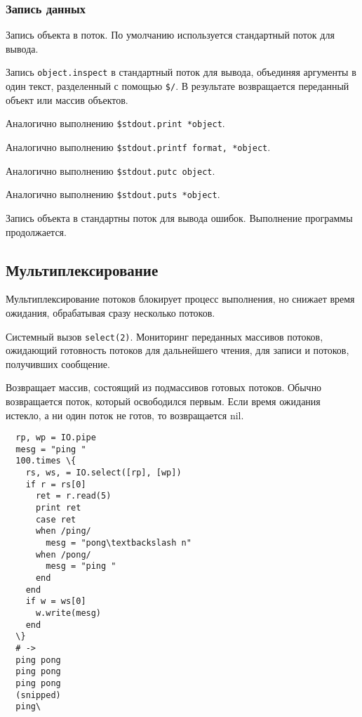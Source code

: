 \subsubsection*{Запись данных}

\begin{methodlist}
  Запись объекта в поток. По умолчанию используется стандартный поток для вывода.

  Запись \verb!object.inspect! в стандартный поток для вывода, объединяя аргументы в один текст, разделенный с помощью \verb!$/!. В результате возвращается переданный объект или массив объектов.
 
  Аналогично выполнению \verb!$stdout.print *object!. 

  Аналогично выполнению \verb!$stdout.printf format, *object!.
 
  Аналогично выполнению \verb!$stdout.putc object!.
 
  Аналогично выполнению \verb!$stdout.puts *object!.
 
  Запись объекта в стандартны поток для вывода ошибок. Выполнение программы продолжается.
\end{methodlist}

\subsection{Мультиплексирование}

Мультиплексирование потоков блокирует процесс выполнения, но снижает время ожидания, обрабатывая сразу несколько потоков.

\begin{methodlist}
  Системный вызов \verb!select(2)!. Мониторинг переданных массивов потоков, ожидающий готовность потоков для дальнейшего чтения, для записи и потоков, получивших сообщение.

  Возвращает массив, состоящий из подмассивов готовых потоков. Обычно возвращается поток, который освободился первым. Если время ожидания истекло, а ни один поток не готов, то возвращается nil.
  \begin{verbatim}
  rp, wp = IO.pipe
  mesg = "ping "
  100.times \{
    rs, ws, = IO.select([rp], [wp])
    if r = rs[0]
      ret = r.read(5)
      print ret
      case ret
      when /ping/
        mesg = "pong\textbackslash n"
      when /pong/
        mesg = "ping "
      end
    end
    if w = ws[0]
      w.write(mesg)
    end
  \}
  # ->
  ping pong
  ping pong
  ping pong
  (snipped)
  ping\
  \end{verbatim}
\end{methodlist}
 
